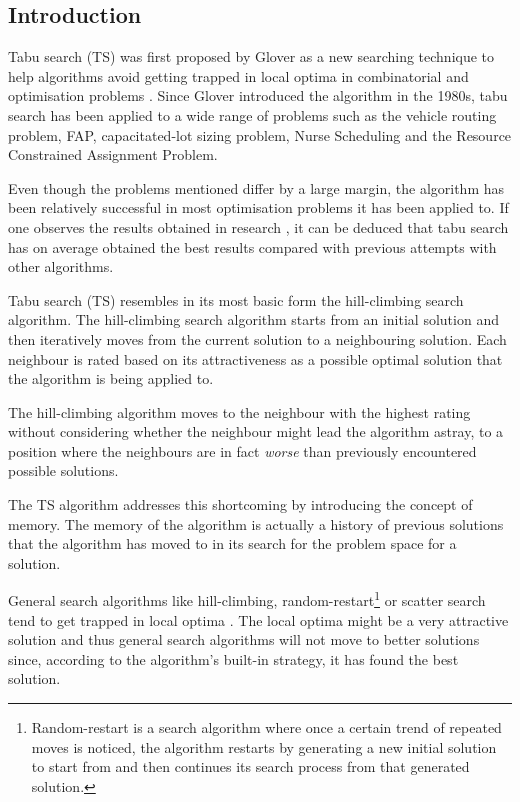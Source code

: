 \subsection{Introduction}
\label{sec:TSIntroduction}
Tabu search (TS) was first proposed by Glover as a new searching technique to help algorithms avoid getting trapped in local optima in combinatorial and optimisation problems \cite{TabuRCAProblem}. Since Glover introduced the algorithm in the 1980s, tabu search has been applied to a wide range of problems such as the vehicle routing problem\cite{TabuVechicleRoutingWithTimeWindows}, FAP\cite{TabuMontemanniSmith}, capacitated-lot sizing problem\cite{TabuCarryOver}, Nurse Scheduling\cite{TabuNurse} and the Resource Constrained Assignment Problem\cite{TabuRCAProblem}. 

Even though the problems mentioned differ by a large margin, the algorithm has been relatively successful in most optimisation problems it has been applied to. If one observes the results obtained in research \cite{TabuCarryOver,TabuSingleMachineScheduling,TabuVechicleRoutingWithTimeWindows,TabuBiddingStrats,TabuCrewSchedulingProblem,ReactiveTabuVHR,TabuRCAProblem,TabuCSP,TabuMontemanniSmith,tabuglobalplanning3g}, it can be deduced that tabu search has on average obtained the best results compared with previous attempts with other algorithms. 

Tabu search (TS) resembles in its most basic form the hill-climbing search algorithm\cite{TabuBiddingStrats}. The hill-climbing search algorithm starts from an initial solution and then iteratively moves from the current solution to a neighbouring solution\cite{AIModernApproach}. Each neighbour is rated based on its attractiveness as a possible optimal solution that the algorithm is being applied to\cite{AIModernApproach}. 

The hill-climbing algorithm moves to the neighbour with the highest rating without considering whether the neighbour might lead the algorithm astray, to a position where the neighbours are in fact \emph{worse} than previously encountered possible solutions\cite{AIModernApproach}. 

The TS algorithm addresses this shortcoming by introducing the concept of memory\cite{TabuBiddingStrats}. The memory of the algorithm is actually a history of previous solutions that the algorithm has moved to in its search for the problem space for a solution\cite{TabuBiddingStrats}. 

General search algorithms like hill-climbing, random-restart\footnote{Random-restart is a search algorithm where once a certain trend of repeated moves is noticed, the algorithm restarts by generating a new initial solution to start from and then continues its search process from that generated solution\cite{AIModernApproach}.} or scatter search tend to get trapped in local optima \cite{AIModernApproach}. The local optima might be a very attractive solution and thus general search algorithms will not move to better solutions since, according to the algorithm's built-in strategy, it has found the best solution. 

